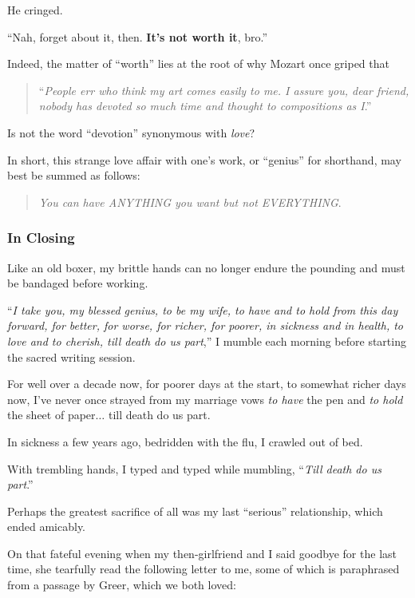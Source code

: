 \documentclass{article}
\begin{document}
%
He cringed.

``Nah, forget about it, then. \textbf{It's not worth it}, bro.''

%
Indeed, the matter of ``worth'' lies at the root of why Mozart once griped that

\begin{quotation}
	``\textit{People err who think my art comes easily to me. I assure you, dear friend, nobody has devoted so much time and thought to compositions as I}.''
\end{quotation}
Is not the word ``devotion'' synonymous with \textit{love}?

%
In short, this strange love affair with one's work, or ``genius'' for shorthand, may best be summed as follows:

\begin{quotation}
	\textit{You can have ANYTHING you want but not EVERYTHING}.
\end{quotation}

\subsubsection{In Closing}
\textsf{Like an old boxer, my brittle hands can no longer endure the pounding and must be bandaged before working.}

%
``\textit{I take you, my blessed genius, to be my wife, to have and to hold from this day forward, for better, for worse, for richer, for poorer, in sickness and in health, to love and to cherish, till death do us part},'' I mumble each morning before starting the sacred writing session.

%
For well over a decade now, for poorer days at the start, to somewhat richer days now, I've never once strayed from my marriage vows \textit{to have} the pen and \textit{to hold} the sheet of paper$\ldots$ till death do us part.

%
In sickness a few years ago, bedridden with the flu, I crawled out of bed.

With trembling hands, I typed and typed while mumbling, ``\textit{Till death do us part}.''

%
Perhaps the greatest sacrifice of all was my last ``serious'' relationship, which ended amicably.

%
On that fateful evening when my then-girlfriend and I said goodbye for the last time, she tearfully read the following letter to me, some of which is paraphrased from a passage by Greer, which we both loved:
\end{document}
